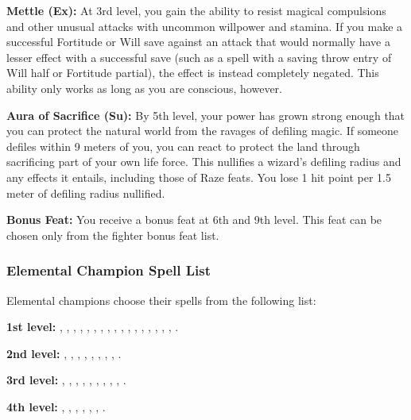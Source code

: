 {\textbf{Mettle (Ex):} At 3rd level, you gain the ability to resist magical compulsions and other unusual attacks with uncommon willpower and stamina. If you make a successful Fortitude or Will save against an attack that would normally have a lesser effect with a successful save (such as a spell with a saving throw entry of Will half or Fortitude partial), the effect is instead completely negated. This ability only works as long as you are conscious, however.

\textbf{Aura of Sacrifice (Su):} By 5th level, your power has grown strong enough that you can protect the natural world from the ravages of defiling magic. If someone defiles within 9 meters of you, you can react to protect the land through sacrificing part of your own life force. This nullifies a wizard's defiling radius and any effects it entails, including those of Raze feats. You lose 1 hit point per 1.5 meter of defiling radius nullified.

\textbf{Bonus Feat:} You receive a bonus feat at 6th and 9th level. This feat can be chosen only from the fighter bonus feat list.

\subsubsection{Elemental Champion Spell List}
Elemental champions choose their spells from the following list:

\textbf{1st level:} , , , , , , , , , , , , , , , , , .

\textbf{2nd level:} , , , , , , , , .

\textbf{3rd level:} , , , , , , , , , .

\textbf{4th level:} , , , , , , .

}
